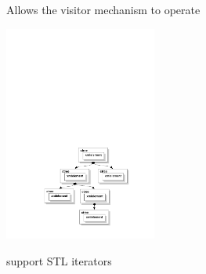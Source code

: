 \documentclass{beamer}
\begin{document}
\begin{frame}
\begin{columns}
\begin{column}[c]{5cm}
\begin{overlayarea}{\textwidth}{50mm}
{		  {\vspace{22mm} \begin{block}{}
		 		Allows the visitor mechanism to operate
				\end{block}}
			 {\vspace{12mm} \includegraphics[width=50mm]{imgs/ctree.pdf}}
		 	\only<8> {\vspace{32mm} \begin{block}{}
		 		support STL iterators
				\end{block}}
		}
		\end{overlayarea}
		\end{column}
	\end{columns}
\end{frame}

\end{document}
